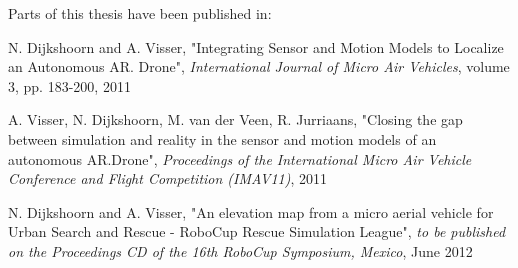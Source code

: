 Parts of this thesis have been published in:

\vspace{\baselineskip}

N. Dijkshoorn and A. Visser, "Integrating Sensor and Motion Models to Localize an Autonomous AR. Drone", \textit{International Journal of Micro Air Vehicles}, volume 3, pp. 183-200, 2011

\vspace{\baselineskip}

A. Visser, N. Dijkshoorn, M. van der Veen, R. Jurriaans, "Closing the gap between simulation and reality in the sensor and motion models of an autonomous AR.Drone", \textit{Proceedings of the International Micro Air Vehicle Conference and Flight Competition (IMAV11)}, 2011

\vspace{\baselineskip}

N. Dijkshoorn and A. Visser, "An elevation map from a micro aerial vehicle for Urban Search and Rescue - RoboCup Rescue Simulation League", \textit{to be published on the Proceedings CD of the 16th RoboCup Symposium, Mexico}, June 2012